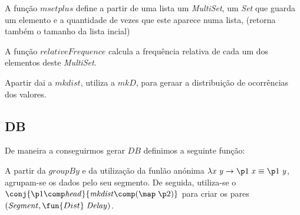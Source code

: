 \documentclass[11pt, a4paper, fleqn]{article}
\newcommand{\Conid}[1]{\mathit{#1}}
\newcommand{\Varid}[1]{\mathit{#1}}
\def\resethooks{%
  \global\let\SaveRestoreHook\empty
  \global\let\ColumnHook\empty}
\let\hspre\empty
\let\hspost\empty
\begin{document}
A função \ensuremath{\Varid{msetplus}} define a partir de uma lista um \textit{MultiSet}, um \textit{Set} que guarda um elemento e a quantidade de vezes que este aparece numa lista, 
(retorna também o tamanho da lista incial)

A função \ensuremath{\Varid{relativeFrequence}} calcula a frequência relativa de cada um dos elementos deste \textit{MultiSet}.

Apartir dai a \ensuremath{\Varid{mkdist}}, utiliza a \ensuremath{\Varid{mkD}}, para geraar a distribuição de ocorrências dos valores.

\subsection{DB}

De maneira a conseguirmos gerar \ensuremath{\Conid{DB}} definimos a seguinte função:

\resethooks

A partir da \ensuremath{\Varid{groupBy}} e da utilização da funlão anónima \ensuremath{\lambda \Varid{x}\;\Varid{y}\to \p1\;\Varid{x}\equiv \p1\;\Varid{y}}, agrupam-se os dados pelo seu segmento.
De seguida, utiliza-se o \ensuremath{\conj{\p1\comp \Varid{head}}{\Varid{mkdist}\comp (\map \;\p2)}} para criar os pares \ensuremath{(\Conid{Segment},\fun{Dist}\;\Conid{Delay})}. 


\pagebreak
\end{document}
